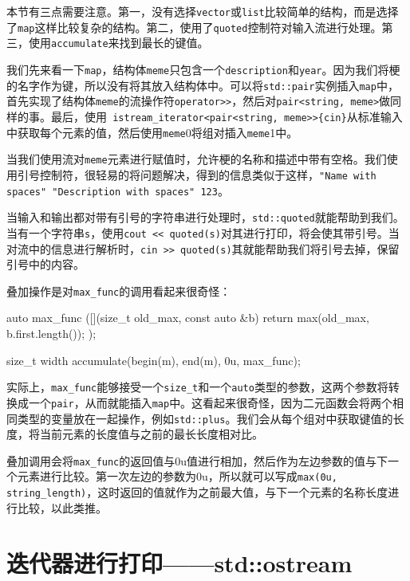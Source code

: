 
本节有三点需要注意。第一，没有选择\texttt{vector}或\texttt{list}比较简单的结构，而是选择了\texttt{map}这样比较复杂的结构。第二，使用了\texttt{quoted}控制符对输入流进行处理。第三，使用\texttt{accumulate}来找到最长的键值。

我们先来看一下\texttt{map}，结构体\texttt{meme}只包含一个\texttt{description}和\texttt{year}。因为我们将梗的名字作为键，所以没有将其放入结构体中。可以将\texttt{std::pair}实例插入\texttt{map}中，首先实现了结构体\texttt{meme}的流操作符\texttt{operator>>}，然后对\texttt{pair<string, meme>}做同样的事。最后，使用\texttt{ istream\_iterator<pair<string, meme>>\{cin\}}从标准输入中获取每个元素的值，然后使用\texttt{meme}0将组对插入\texttt{meme}1中。

当我们使用流对\texttt{meme}元素进行赋值时，允许梗的名称和描述中带有空格。我们使用引号控制符，很轻易的将问题解决，得到的信息类似于这样，\texttt{"Name with spaces" "Description with spaces" 123}。

当输入和输出都对带有引号的字符串进行处理时，\texttt{std::quoted}就能帮助到我们。当有一个字符串\texttt{s}，使用\texttt{cout << quoted(s)}对其进行打印，将会使其带引号。当对流中的信息进行解析时，\texttt{cin >> quoted(s)}其就能帮助我们将引号去掉，保留引号中的内容。

叠加操作是对\texttt{max\_func}的调用看起来很奇怪：

\begin{codebox}[cpp]
auto max_func ([](size_t old_max, const auto &b) {
    return max(old_max, b.first.length());
});

size_t width {accumulate(begin(m), end(m), 0u, max_func)};
\end{codebox}

实际上，\texttt{max\_func}能够接受一个\texttt{size\_t}和一个\texttt{auto}类型的参数，这两个参数将转换成一个\texttt{pair}，从而就能插入\texttt{map}中。这看起来很奇怪，因为二元函数会将两个相同类型的变量放在一起操作，例如\texttt{std::plus}。我们会从每个组对中获取键值的长度，将当前元素的长度值与之前的最长长度相对比。

叠加调用会将\texttt{max\_func}的返回值与0u值进行相加，然后作为左边参数的值与下一个元素进行比较。第一次左边的参数为0u，所以就可以写成\texttt{max(0u, string\_length)}，这时返回的值就作为之前最大值，与下一个元素的名称长度进行比较，以此类推。


\section{迭代器进行打印——std::ostream}

